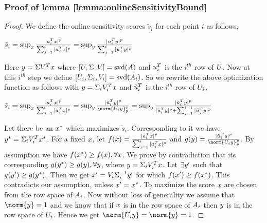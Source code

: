 \subsubsection{Proof of lemma \ref{lemma:onlineSensitivityBound}}
\begin{proof}{\label{proof:onlineSensitivityBound}}
We define the online sensitivity scores $\tilde{s}_{i}$ for each point $i$ as follows,
\begin{center}
 $\tilde{s}_{i} = \sup_{\*x}\frac{\vert \*a_{i}^{T}\*x\vert^{p}}{\sum_{j=1}^{i}\vert \*a_{j}^{T}\*x\vert^{p}} = \sup_{\*y}\frac{\vert \*u_{i}^{T}\*y\vert^{p}} {\sum_{j=1}^{i}\vert \*u_{j}^{T}\*y\vert^{p}}$
\end{center}
Here $\*y = \Sigma \*V^{T}\*x$ where $[\*U,\Sigma,\*V] = \mbox{svd}(\*A)$ and $\*u_{i}^{T}$ is the $i^{th}$ row of $\*U$. Now at this $i^{th}$ step we define $[\*U_{i},\Sigma_{i},\*V_{i}] = \mbox{svd}(\*A_{i})$. So we rewrite the above optimization function as follows with $\*y = \Sigma_{i} \*V_{i}^{T}\*x$ and $\tilde{\*u}_{i}^{T}$ is the $i^{th}$ row of $\*U_{i}$,
\begin{center}
 $\tilde{s}_{i} = \sup_{\*x}\frac{\vert \*a_{i}^{T}\*x\vert^{p}}{\sum_{j=1}^{i}\vert \*a_{j}^{T}\*x\vert^{p}}=\sup_{\*y}\frac{\vert \tilde{\*u}_{i}^{T}\*y\vert^{p}}{\norm{\*U_{i}\*y}_{p}^{p}}=\sup_{\*y}\frac{\vert \tilde{\*u}_{i}^{T}\*y\vert^{p}}{\vert \tilde{\*u}_{i}^{T}\*y\vert^{p}+\sum_{j=1}^{i-1}\vert \tilde{\*u}_{j}^{T}\*y\vert^{p}}$
\end{center}
Let there be an $\*x^{*}$ which maximizes $\tilde{s}_{i}$. Corresponding to it we have  $\*y^{*} = \Sigma_{i} \*V_{i}^{T}\*x^{*}$. For a fixed $\*x$, let $f(\*x) = \frac{\vert \*a_{i}^{T}\*x\vert^{p}}{\sum_{j=1}^{i}\vert \*a_{j}^{T}\*x\vert^{p}}$ and $g(\*y) = \frac{\vert \tilde{\*u}_{i}^{T}\*y\vert^{p}}{\norm{\*U_{i}\*y}_{p}^{p}}$. By assumption we have $f(\*x^{*}) \geq f(\*x), \forall \*x$. We prove by contradiction that its corresponding $g(\*y^{*}) \geq g(\*y), \forall \*y$, where $\*y = \Sigma_{i} \*V_{i}^{T}\*x$. Let $\exists \*y'$ such that $g(\*y') \geq g(\*y^{*})$. Then we get $\*x' = \*V_{i}\Sigma_{i}^{-1}\*y'$ for which $f(\*x') \geq f(\*x^{*})$. This contradicts our assumption, unless $\*x' = \*x^{*}$. To maximize the score $\*x$ are chosen from the row space of $\*A_{i}$. Now without loss of generality we assume that $\norm{\*y} = 1$ and we know that if $\*x$ is in the row space of $\*A_{i}$ then $\*y$ is in the row space of $\*U_{i}$. Hence we get $\norm{\*U_{i}\*y} = \norm{\*y} = 1$.


\end{proof}
